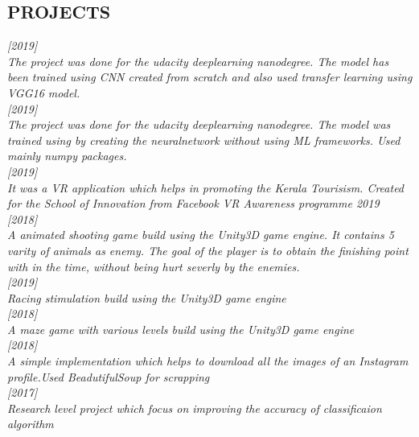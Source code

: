 \documentclass[margin]{res}
\begin{document}
\begin{resume}
\section{PROJECTS} 

    \sl
    \normalfont {} \hfill [2019] \\ 
     The project was done for the udacity deeplearning nanodegree. The model has been trained using CNN created from scratch and also used transfer learning using VGG16 model. 
\\
    \normalfont {} \hfill [2019] \\ 
     The project was done for the udacity deeplearning nanodegree. The model was trained using by creating the neuralnetwork without using ML frameworks. Used mainly numpy packages.
     \\   
    \normalfont {} \hfill [2019]\\ 
     It was a VR application which helps in promoting the Kerala Tourisism. Created for the  School of Innovation from Facebook VR Awareness programme 2019 
     \\     \normalfont {} \hfill [2018] \\ 
     A animated shooting game build using the Unity3D game engine. It contains 5 varity of animals as enemy. The goal of the player is to obtain the finishing point with in the time, without being hurt severly by the enemies.
     \\     \normalfont {} \hfill [2019] \\ 
     Racing stimulation build using the Unity3D game engine
     \\     \normalfont {} \hfill [2018] \\ 
     A maze game with various levels build using the Unity3D game engine
     \\    \normalfont {} \hfill [2018]\\
     A simple implementation which helps to download all the images of an Instagram profile.Used BeadutifulSoup for scrapping\\
    \normalfont {} \hfill [2017] \\ Research level project which focus on improving the accuracy of classificaion algorithm




\end{resume}
\end{document}
